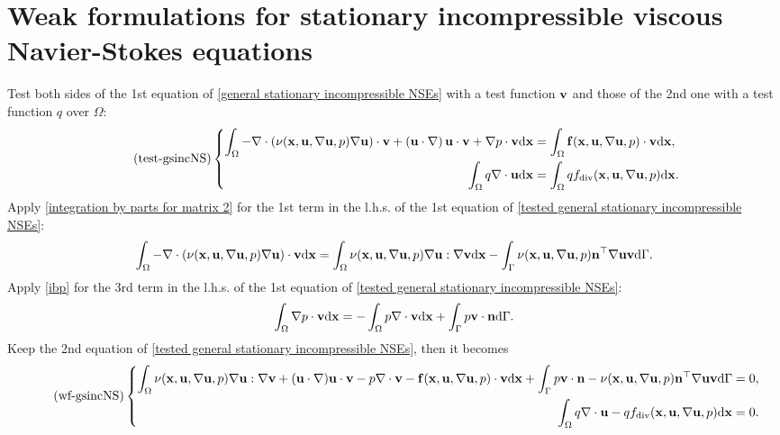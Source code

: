 \documentclass[oneside,11pt]{book}
\numberwithin{equation}{section}
\begin{document}
\section{Weak formulations for stationary incompressible viscous Navier-Stokes equations}
Test both sides of the 1st equation of \eqref{general stationary incompressible NSEs} with a test function ${\bf v}$ and those of the 2nd one with a test function $q$ over $\Omega$:
\begin{equation}
    \label{tested general stationary incompressible NSEs}
    \tag{test-gsincNS}
    \left\{\begin{split}
        \int_\Omega -\nabla\cdot\left(\nu({\bf x},{\bf u},\nabla{\bf u},p)\nabla{\bf u}\right)\cdot{\bf v} + \left({\bf u}\cdot\nabla\right){\bf u}\cdot{\bf v} + \nabla p\cdot{\bf v}{\rm d}{\bf x} &= \int_\Omega {\bf f}({\bf x},{\bf u},\nabla{\bf u},p)\cdot{\bf v}{\rm d}{\bf x},\\
        \int_\Omega q\nabla\cdot{\bf u}{\rm d}{\bf x} &= \int_\Omega qf_{\rm div}({\bf x},{\bf u},\nabla{\bf u},p){\rm d}{\bf x}.
    \end{split}\right.
\end{equation}
Apply \eqref{integration by parts for matrix 2} for the 1st term in the l.h.s. of the 1st equation of \eqref{tested general stationary incompressible NSEs}:
\begin{align*}
    \int_\Omega -\nabla\cdot\left(\nu({\bf x},{\bf u},\nabla{\bf u},p)\nabla{\bf u}\right)\cdot{\bf v}{\rm d}{\bf x} = \int_\Omega \nu({\bf x},{\bf u},\nabla{\bf u},p)\nabla{\bf u}:\nabla{\bf v}{\rm d}{\bf x} - \int_\Gamma \nu({\bf x},{\bf u},\nabla{\bf u},p){\bf n}^\top\nabla{\bf u}{\bf v}{\rm d}\Gamma.
\end{align*}
Apply \eqref{ibp} for the 3rd term in the l.h.s. of the 1st equation of \eqref{tested general stationary incompressible NSEs}:
\begin{align*}
    \int_\Omega \nabla p\cdot{\bf v}{\rm d}{\bf x} = -\int_\Omega p\nabla\cdot{\bf v}{\rm d}{\bf x} + \int_\Gamma p{\bf v}\cdot{\bf n}{\rm d}\Gamma.
\end{align*} 
Keep the 2nd equation of \eqref{tested general stationary incompressible NSEs}, then it becomes
\begin{equation}
    \label{weak formulation of general stationary incompressible NSEs}
    \tag{wf-gsincNS}
    \left\{\begin{split}
        \int_\Omega \nu({\bf x},{\bf u},\nabla{\bf u},p)\nabla{\bf u}:\nabla{\bf v} + ({\bf u}\cdot\nabla){\bf u}\cdot{\bf v} - p\nabla\cdot{\bf v} - {\bf f}({\bf x},{\bf u},\nabla{\bf u},p)\cdot{\bf v}{\rm d}{\bf x} + \int_\Gamma p{\bf v}\cdot{\bf n} - \nu({\bf x},{\bf u},\nabla{\bf u},p){\bf n}^\top\nabla{\bf u}{\bf v}{\rm d}\Gamma &= 0,\\
        \int_\Omega q\nabla\cdot{\bf u} - qf_{\rm div}({\bf x},{\bf u},\nabla{\bf u},p){\rm d}{\bf x} &= 0.
    \end{split}\right.    
\end{equation}
\end{document}
